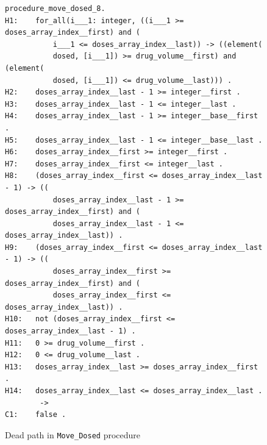 \begin{figure}
\singlespacing
\begin{lstlisting}[frame=single, gobble=0]
procedure_move_dosed_8.
H1:    for_all(i___1: integer, ((i___1 >= doses_array_index__first) and (
           i___1 <= doses_array_index__last)) -> ((element(
           dosed, [i___1]) >= drug_volume__first) and (element(
           dosed, [i___1]) <= drug_volume__last))) .
H2:    doses_array_index__last - 1 >= integer__first .
H3:    doses_array_index__last - 1 <= integer__last .
H4:    doses_array_index__last - 1 >= integer__base__first .
H5:    doses_array_index__last - 1 <= integer__base__last .
H6:    doses_array_index__first >= integer__first .
H7:    doses_array_index__first <= integer__last .
H8:    (doses_array_index__first <= doses_array_index__last - 1) -> ((
           doses_array_index__last - 1 >= doses_array_index__first) and (
           doses_array_index__last - 1 <= doses_array_index__last)) .
H9:    (doses_array_index__first <= doses_array_index__last - 1) -> ((
           doses_array_index__first >= doses_array_index__first) and (
           doses_array_index__first <= doses_array_index__last)) .
H10:   not (doses_array_index__first <= doses_array_index__last - 1) .
H11:   0 >= drug_volume__first .
H12:   0 <= drug_volume__last .
H13:   doses_array_index__last >= doses_array_index__first .
H14:   doses_array_index__last <= doses_array_index__last .
        ->
C1:    false .
\end{lstlisting}
\doublespacing
\caption{Dead path in \lstinline{Move_Dosed} procedure}
\label{listing:pcapump_dosemonitor:dead_path}
\end{figure}

